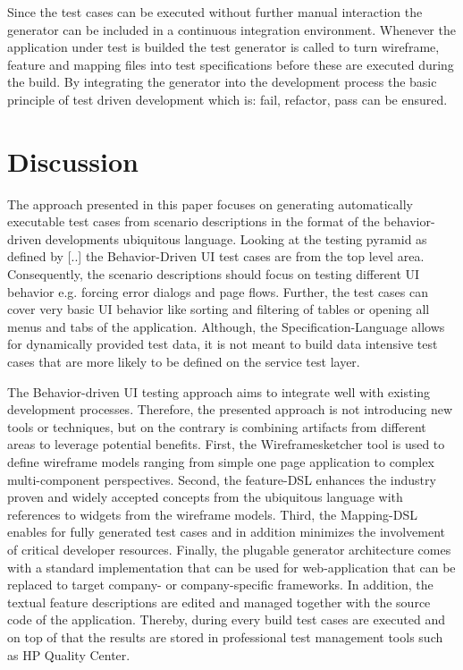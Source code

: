 \documentclass{sig-alternate-05-2015}
\begin{document}
Since the test cases can be executed without further manual interaction the generator can be included in a continuous integration environment.
Whenever the application under test is builded the test generator is called to turn wireframe, feature and mapping files into test specifications before these are executed during the build.
By integrating the generator into the development process the basic principle of test driven development which is: fail, refactor, pass can be ensured.

\section{Discussion}\label{sec:Discussion}
The approach presented in this paper focuses on generating automatically executable test cases from scenario descriptions in the format of the behavior-driven developments ubiquitous language.
Looking at the testing pyramid as defined by [..] the Behavior-Driven UI test cases are from the top level area.
Consequently, the scenario descriptions should focus on testing different UI behavior e.g. forcing error dialogs and page flows.
Further, the test cases can cover very basic UI behavior like sorting and filtering of tables or opening all menus and tabs of the application. 
Although, the Specification-Language allows for dynamically provided test data, it is not meant to build data intensive test cases that are more likely to be defined on the service test layer.

The Behavior-driven UI testing approach aims to integrate well with existing development processes. 
Therefore, the presented approach is not introducing new tools or techniques, but on the contrary is combining artifacts from different areas to leverage potential benefits.
First, the Wireframesketcher tool is used to define wireframe models ranging from simple one page application to complex multi-component perspectives.
Second, the feature-DSL enhances the industry proven and widely accepted concepts from the ubiquitous language with references to widgets from the wireframe models.
Third, the Mapping-DSL enables for fully generated test cases and in addition minimizes the involvement of critical developer resources. 
Finally, the plugable generator architecture comes with a standard implementation that can be used for web-application that can be replaced to target company- or company-specific frameworks.
In addition, the textual feature descriptions are edited and managed together with the source code of the application.
Thereby, during every build test cases are executed and on top of that the results are stored in professional test management tools such as HP Quality Center.
\end{document}
